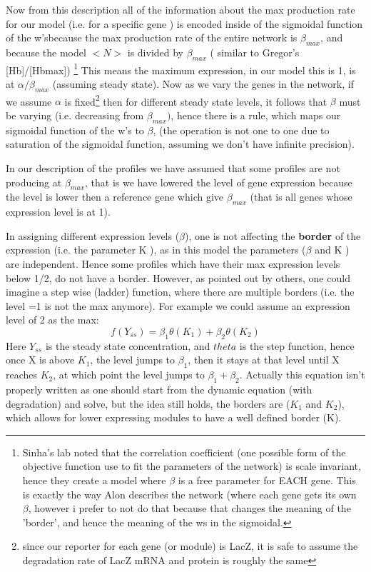   Now from this description all of the information about the max production rate for our model (i.e. for a specific gene ) is encoded inside of the sigmoidal function of the w'sbecause the max production rate of the entire network is $\beta_{max}$, and because the model $<N>$ is divided by $\beta_{max}$ ( similar to Gregor's [Hb]/[Hbmax]) \footnote[1]{Sinha's lab noted that the correlation coefficient (one possible form of the objective function use to fit the parameters of the network) is scale invariant, hence they create a model where $\beta$ is a free parameter for EACH gene.  This is exactly the way Alon describes the network (where each gene gets its own $\beta$, however i prefer to not do that because that changes the meaning of the 'border', and hence the meaning of the ws in the sigmoidal.}  This means the maximum expression, in our model this is 1, is at  $\alpha/ \beta_{max}$ (assuming steady state).  Now as we vary the genes in the network, if we assume $\alpha$ is fixed\footnote[2]{ since our reporter for each gene (or module) is LacZ, it is safe to assume the degradation rate of LacZ mRNA and protein is roughly the same}  then for different steady state levels, it follows that $\beta$ must be varying (i.e. decreasing from $\beta_{max})$, hence there is a rule, which maps our sigmoidal function of the w's to $\beta$,  (the operation is not one to one due to saturation of the sigmoidal function, assuming we don't have infinite precision).
\par
In our description of the profiles we have assumed that some profiles are not producing at $\beta_{max}$, that is we have lowered the level of gene expression because the level is lower then a reference gene which give $\beta_{max}$ (that is all genes whose expression level is at 1).
\par
In assigning different expression levels ($\beta$), one is not affecting the \textbf{border} of the expression (i.e. the parameter K ), as in this model the parameters ($\beta$ and K ) are independent.  Hence some profiles which have their max expression levels below 1/2, do not have a border.  However, as pointed out by others, one could imagine a step wise (ladder) function, where there are multiple borders (i.e. the level =1 is not the max anymore).  For example we could assume an expression level of 2 as the max:
\begin{equation}\label{}
    f(Y_{ss}) = \beta_1\theta(K_1) + \beta_2\theta(K_2)
\end{equation}
Here $Y_{ss}$ is the steady state concentration, and $theta$ is the step function, hence once X is above $K_1$, the level jumps to $\beta_1$, then it stays at that level until X reaches $K_2$, at which point the level jumps to $\beta_1 + \beta_2$.  Actually this equation isn't properly written as one should start from the dynamic equation (with degradation) and solve, but the idea still holds, the borders are ($K_1$ and $K_2$), which allows for lower expressing modules to have a well defined border (K).

